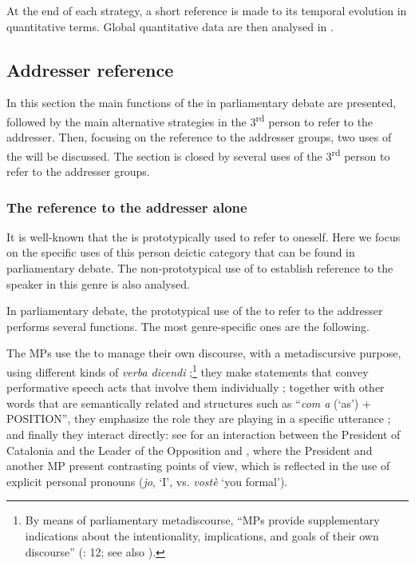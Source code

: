 \documentclass[output=paper]{langscibook}
\begin{document}
At the end of each strategy, a short reference is made to its temporal evolution in quantitative terms. Global quantitative data are then analysed in .



 
\subsection{Addresser reference}\label{sec:nogue:2.1}



In this section the main functions of the  in parliamentary debate are presented, followed by the main alternative strategies in the 3\textsuperscript{rd} person to refer to the addresser. Then, focusing on the reference to the addresser groups, two uses of the  will be discussed. The section is closed by several uses of the 3\textsuperscript{rd} person to refer to the addresser groups.



 

 \subsubsection{The reference to the addresser alone}\label{sec:nogue:2.1.1}




It is well-known that the  is prototypically used to refer to oneself. Here we focus on the specific uses of this person deictic category that can be found in parliamentary debate. The non-prototypical use of  to establish reference to the speaker in this genre is also analysed.



 


\label{sec:nogue:2.1.1.1}





In parliamentary debate, the prototypical use of the  to refer to the addresser performs several functions. The most genre-specific ones are the following.



The MPs use the  to manage their own discourse, with a metadiscursive purpose, using different kinds of \textit{verba dicendi} ;\footnote{By means of parliamentary metadiscourse, “MPs provide supplementary indications about the intentionality, implications, and goals of their own discourse” (\citealt{Ilie2015}: 12; see also \citealt{Ilie2003}).} they make statements that convey performative speech acts that involve them individually ; together with other words that are semantically related and structures such as “\textit{com a} (‘as’) + POSITION”, they emphasize the role they are playing in a specific utterance ; and finally they interact directly: see  for an interaction between the President of Catalonia and the Leader of the Opposition and , where the President and another MP present contrasting points of view, which is reflected in the use of explicit personal pronouns (\textit{jo}, ‘I’, vs. \textit{vostè} ‘you formal’).
\end{document}
